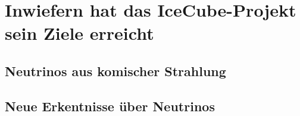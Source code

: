 \chapter{Inwiefern hat das IceCube-Projekt sein Ziele erreicht} 
    \vspace{8pt}
    \section{Neutrinos aus komischer Strahlung}
    \section{Neue Erkentnisse über Neutrinos}